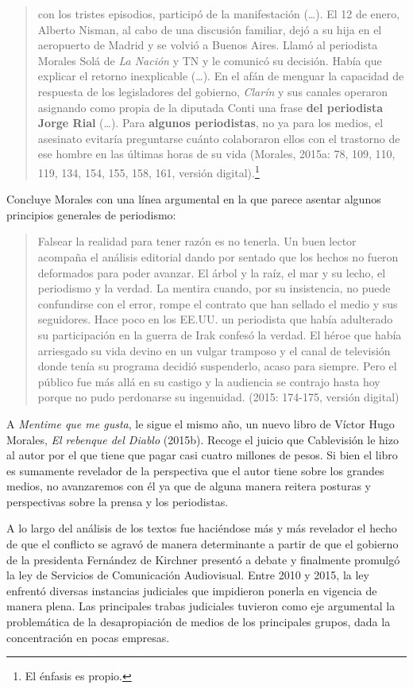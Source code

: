 \begin{quote}
con los tristes episodios, participó de la manifestación (\ldots). El 12 de enero, Alberto Nisman, al cabo de una discusión familiar, dejó a su hija en el aeropuerto de Madrid y se volvió a Buenos Aires. Llamó al periodista Morales Solá de \emph{La Nación} y TN y le comunicó su decisión. Había que explicar el retorno inexplicable (\ldots). En el afán de menguar la capacidad de respuesta de los legisladores del gobierno, \emph{Clarín} y sus canales operaron asignando como propia de la diputada Conti una frase \textbf{del periodista Jorge Rial} (\ldots). Para \textbf{algunos periodistas}, no ya para los medios, el asesinato evitaría preguntarse cuánto colaboraron ellos con el trastorno de ese hombre en las últimas horas de su vida (Morales, 2015a: 78, 109, 110, 119, 134, 154, 155, 158, 161, versión digital).\footnote{El énfasis es propio.}
\end{quote}

Concluye Morales con una línea argumental en la que parece asentar algunos principios generales de periodismo:

\begin{quote}
Falsear la realidad para tener razón es no tenerla. Un buen lector acompaña el análisis editorial dando por sentado que los hechos no fueron deformados para poder avanzar. El árbol y la raíz, el mar y su lecho, el periodismo y la verdad. La mentira cuando, por su insistencia, no puede confundirse con el error, rompe el contrato que han sellado el medio y sus seguidores. Hace poco en los EE.UU. un periodista que había adulterado su participación en la guerra de Irak confesó la verdad. El héroe que había arriesgado su vida devino en un vulgar tramposo y el canal de televisión donde tenía su programa decidió suspenderlo, acaso para siempre. Pero el público fue más allá en su castigo y la audiencia se contrajo hasta hoy porque no pudo perdonarse su ingenuidad. (2015: 174-175, versión digital)
\end{quote}

A \emph{Mentime que me gusta}, le sigue el mismo año, un nuevo libro de Víctor Hugo Morales, \emph{El rebenque del Diablo} (2015b). Recoge el juicio que Cablevisión le hizo al autor por el que tiene que pagar casi cuatro millones de pesos. Si bien el libro es sumamente revelador de la perspectiva que el autor tiene sobre los grandes medios, no avanzaremos con él ya que de alguna manera reitera posturas y perspectivas sobre la prensa y los periodistas.

A lo largo del análisis de los textos fue haciéndose más y más revelador el hecho de que el conflicto se agravó de manera determinante a partir de que el gobierno de la presidenta Fernández de Kirchner presentó a debate y finalmente promulgó la ley de Servicios de Comunicación Audiovisual. Entre 2010 y 2015, la ley enfrentó diversas instancias judiciales que impidieron ponerla en vigencia de manera plena. Las principales trabas judiciales tuvieron como eje argumental la problemática de la desapropiación de medios de los principales grupos, dada la concentración en pocas empresas.

